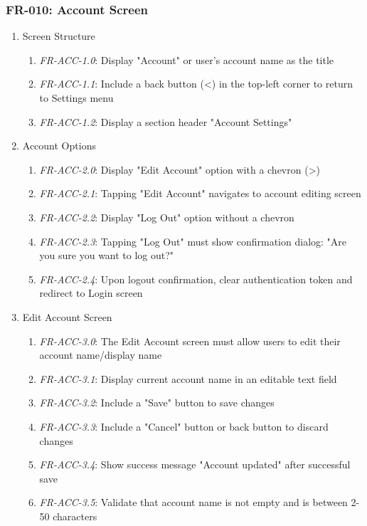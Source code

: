 \documentclass[conference]{IEEEtran}
\begin{document}
            \subsubsection{FR-010: Account Screen}
                \begin{enumerate}
                    \item Screen Structure
                        \begin{enumerate}
                            \item \textit{FR-ACC-1.0}: Display "Account" or user's account name as the title
                            \item \textit{FR-ACC-1.1}: Include a back button (<) in the top-left corner to return to Settings menu
                            \item \textit{FR-ACC-1.2}: Display a section header "Account Settings"
                        \end{enumerate}
                    \item Account Options
                        \begin{enumerate}
                            \item \textit{FR-ACC-2.0}: Display "Edit Account" option with a chevron (>)
                            \item \textit{FR-ACC-2.1}: Tapping "Edit Account" navigates to account editing screen
                            \item \textit{FR-ACC-2.2}: Display "Log Out" option without a chevron
                            \item \textit{FR-ACC-2.3}: Tapping "Log Out" must show confirmation dialog: "Are you sure you want to log out?"
                            \item \textit{FR-ACC-2.4}: Upon logout confirmation, clear authentication token and redirect to Login screen
                        \end{enumerate}
                    \item Edit Account Screen
                        \begin{enumerate}
                            \item \textit{FR-ACC-3.0}: The Edit Account screen must allow users to edit their account name/display name
                            \item \textit{FR-ACC-3.1}: Display current account name in an editable text field
                            \item \textit{FR-ACC-3.2}: Include a "Save" button to save changes
                            \item \textit{FR-ACC-3.3}: Include a "Cancel" button or back button to discard changes
                            \item \textit{FR-ACC-3.4}: Show success message "Account updated" after successful save
                            \item \textit{FR-ACC-3.5}: Validate that account name is not empty and is between 2-50 characters
                        \end{enumerate}
                \end{enumerate}
\end{document}
